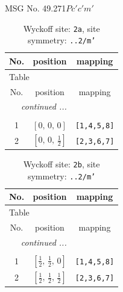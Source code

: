 \documentclass[fleqn,8pt]{jsarticle}
\begin{document}
\setcounter{MaxMatrixCols}{32}

\renewcommand{\tablename}{Table~}
\renewcommand{\figurename}{Figure~}
\begin{center}
\LARGE
MSG No. 49.271\quad$Pc'c'm'$
\end{center}
\renewcommand{\arraystretch}{1.2}
\begin{longtable}{ccc}
\caption{Wyckoff site: {\tt 2a}, site symmetry: {\tt ..2/m'}}
 \\
 \hline \hline
No. & position & mapping \\ \hline \endfirsthead

\multicolumn{2}{l}{\tablename\ \thetable{}} \\
 \hline \hline
No. & position & mapping \\ \hline \endhead

 \hline \hline
\multicolumn{2}{r}{\footnotesize\it continued ...} \\ \endfoot

 \hline \hline
\multicolumn{2}{r}{} \\ \endlastfoot

1 & $\left[ 0,\, 0,\, 0 \right]$ & {\tt [1,4,5,8]} \\ \hline
2 & $\left[ 0,\, 0,\, \frac{1}{2} \right]$ & {\tt [2,3,6,7]} \\
\end{longtable}
\renewcommand{\arraystretch}{1.2}
\begin{longtable}{ccc}
\caption{Wyckoff site: {\tt 2b}, site symmetry: {\tt ..2/m'}}
 \\
 \hline \hline
No. & position & mapping \\ \hline \endfirsthead

\multicolumn{2}{l}{\tablename\ \thetable{}} \\
 \hline \hline
No. & position & mapping \\ \hline \endhead

 \hline \hline
\multicolumn{2}{r}{\footnotesize\it continued ...} \\ \endfoot

 \hline \hline
\multicolumn{2}{r}{} \\ \endlastfoot

1 & $\left[ \frac{1}{2},\, \frac{1}{2},\, 0 \right]$ & {\tt [1,4,5,8]} \\ \hline
2 & $\left[ \frac{1}{2},\, \frac{1}{2},\, \frac{1}{2} \right]$ & {\tt [2,3,6,7]} \\
\end{longtable}
\end{document}
